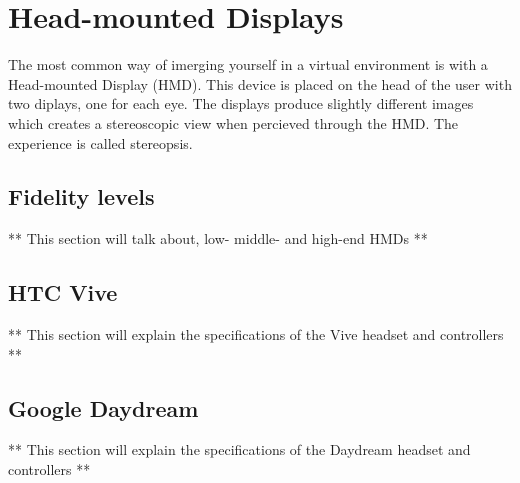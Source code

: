 \section{Head-mounted Displays}
The most common way of imerging yourself in a virtual environment is with a Head-mounted Display (HMD). This device is placed on the head of the user with two diplays, one for each eye. The displays produce slightly different images which creates a stereoscopic view when percieved through the HMD. The experience is called stereopsis. \cite{HMD:goldstein2016sensation}

\subsection{Fidelity levels}
** This section will talk about, low- middle- and high-end HMDs **
\subsection{HTC Vive}
** This section will explain the specifications of the Vive headset and controllers **
\subsection{Google Daydream}
** This section will explain the specifications of the Daydream headset and controllers **
